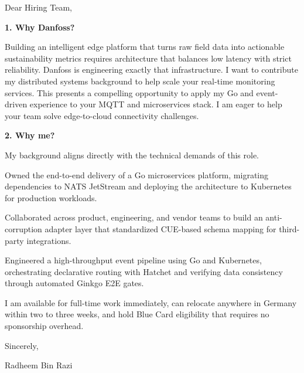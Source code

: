 \documentclass[11pt,a4paper]{coverletter}
\begin{document}

\opening{Dear Hiring Team,}

\vspace{8pt}\noindent\textbf{1. Why Danfoss?}\par\vspace{3pt}

Building an intelligent edge platform that turns raw field data into actionable sustainability metrics requires architecture that balances low latency with strict reliability. Danfoss is engineering exactly that infrastructure. I want to contribute my distributed systems background to help scale your real-time monitoring services. This presents a compelling opportunity to apply my Go and event-driven experience to your MQTT and microservices stack. I am eager to help your team solve edge-to-cloud connectivity challenges.

\vspace{8pt}\noindent\textbf{2. Why me?}\par\vspace{3pt}

My background aligns directly with the technical demands of this role.

\bullets

  \item Owned the end-to-end delivery of a Go microservices platform, migrating dependencies to NATS JetStream and deploying the architecture to Kubernetes for production workloads.

  \item Collaborated across product, engineering, and vendor teams to build an anti-corruption adapter layer that standardized CUE-based schema mapping for third-party integrations.

  \item Engineered a high-throughput event pipeline using Go and Kubernetes, orchestrating declarative routing with Hatchet and verifying data consistency through automated Ginkgo E2E gates.

\bulletsend

I am available for full-time work immediately, can relocate anywhere in Germany within two to three weeks, and hold Blue Card eligibility that requires no sponsorship overhead.

\closing{Sincerely,}{Radheem Bin Razi}

\clearpage
{}

\end{document}
